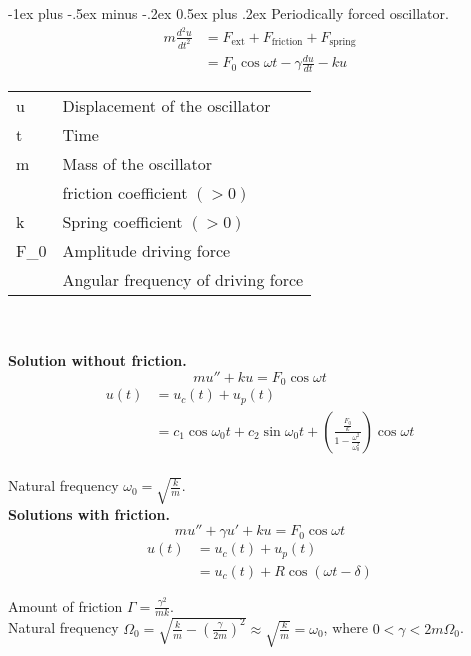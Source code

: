 \documentclass[10pt,landscape,a4paper]{article}
\makeatletter
\renewcommand{\section}{\@startsection{section}{1}{0mm}%
	{-1ex plus -.5ex minus -.2ex}%
	{0.5ex plus .2ex}%
	{\normalfont\large\bfseries}}
\makeatother
\begin{document}
\begin{multicols}{3}
	\section{Periodically forced oscillator.}
	\begin{align*}
		m \frac{d^2u}{dt^2} & = F_{\text{ext}} + F_{\text{friction}} + F_{\text{spring}} \\
		                    & = F_0 \cos{\omega t} - \gamma \frac{du}{dt} - ku
	\end{align*}
	\begin{tabular}{M |l}
		u      & Displacement of the oscillator     \\
		t      & Time                               \\
		m      & Mass of the oscillator             \\
		\gamma & friction coefficient $(>0)$        \\
		k      & Spring coefficient $(>0)$          \\
		F_0    & Amplitude driving force            \\
		\omega & Angular frequency of driving force
	\end{tabular}\\~\\
	\textbf{Solution without friction.}\\
	\[
		m u'' + ku = F_0 \cos{\omega t}
	\]
	\begin{align*}
		u(t) & = u_c(t) + u_p(t)                                                                                                                   \\
		     & = c_1 \cos{\omega_0 t} + c_2 \sin{\omega_0 t} + \left( \frac{\frac{F_0}{k}}{1 - \frac{\omega^2}{\omega_0^2}} \right) \cos{\omega t}
	\end{align*}\\
	Natural frequency $ \omega_0 = \sqrt{\frac{k}{m}} $.\\
	\textbf{Solutions with friction.}\\
	\[
		m u'' + \gamma u' + ku = F_0 \cos{\omega t}
	\]
	\begin{align*}
		u(t) & = u_c(t) + u_p(t)                      \\
		     & = u_c(t) + R \cos{(\omega t - \delta)}
	\end{align*}
	
	Amount of friction $ \Gamma = \frac{\gamma^2}{m k} $.\\
	Natural frequency $ \Omega_0 = \sqrt{\frac{k}{m} - \left(\frac{\gamma}{2 m}\right)^2} \approx \sqrt{\frac{k}{m}} = \omega_0 $, where $ 0 < \gamma < 2m\Omega_0 $.\\
	

\end{multicols}
\end{document}
